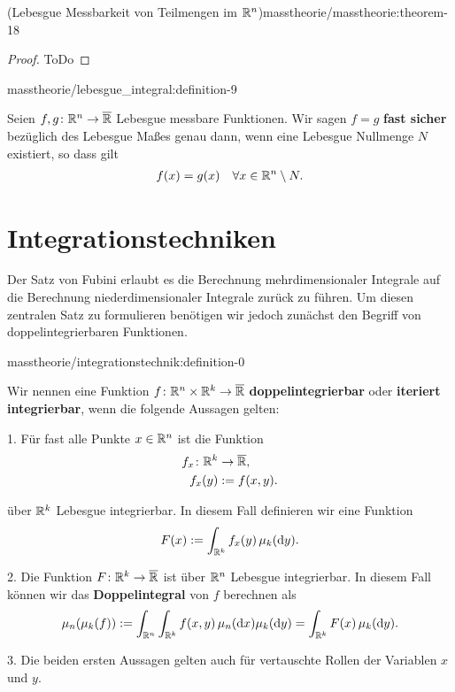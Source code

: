 \begin{theorem}{(Lebesgue Messbarkeit von Teilmengen im \protect\(\mathbb{R}^n\protect\))}{masstheorie/masstheorie:theorem-18}
\begin{proof}
 ToDo
\end{proof}
\begin{definition}{}{masstheorie/lebesgue_integral:definition-9}



\par
Seien \(f,g \colon \mathbb{R}^n \rightarrow \overline{\mathbb{R}}\) Lebesgue messbare Funktionen.
Wir sagen \(f = g\) \textbf{fast sicher} bezüglich des Lebesgue Maßes genau dann, wenn eine Lebesgue Nullmenge \(N\) existiert, so dass gilt
\begin{align*}
f(x) = g(x) \quad \forall x \in \mathbb{R}^n \setminus N.
\end{align*}\end{definition}


\section{Integrationstechniken}
\label{\detokenize{masstheorie/integrationstechnik:integrationstechniken}}\label{\detokenize{masstheorie/integrationstechnik::doc}}
\par
Der Satz von Fubini erlaubt es die Berechnung mehrdimensionaler Integrale auf die Berechnung niederdimensionaler Integrale zurück zu führen.
Um diesen zentralen Satz zu formulieren benötigen wir jedoch zunächst den Begriff von doppelintegrierbaren Funktionen.
\begin{definition}{}{masstheorie/integrationstechnik:definition-0}



\par
Wir nennen eine Funktion \(f \colon \mathbb{R}^n \times \mathbb{R}^k \rightarrow \overline{\mathbb{R}}\) \textbf{doppelintegrierbar} oder \textbf{iteriert integrierbar},
wenn die folgende Aussagen gelten:

\par
1. Für fast alle Punkte \(x \in \mathbb{R}^n\) ist die Funktion
\begin{align*}
f_x \colon \mathbb{R}^k &\rightarrow \overline{\mathbb{R}},\\
f_x(y) &:= f(x,y).
\end{align*}
\par
über \(\mathbb{R}^k\) Lebesgue integrierbar.
In diesem Fall definieren wir eine Funktion
\begin{align*}
F(x) := \int_{\mathbb{R}^k} f_x(y) \, \mu_k(\mathrm{d}y).
\end{align*}
\par
2. Die Funktion \(F \colon \mathbb{R}^k \rightarrow \overline{\mathbb{R}}\) ist über \(\mathbb{R}^n\) Lebesgue integrierbar.
In diesem Fall können wir das \textbf{Doppelintegral} von \(f\) berechnen als
\begin{align*}
\mu_n(\mu_k(f)) := \int_{\mathbb{R}^n}\int_{\mathbb{R}^k} f(x,y) \, \mu_n(\mathrm{d}x) \mu_k(\mathrm{d}y) = \int_{\mathbb{R}^k} F(x) \, \mu_k(\mathrm{d}y).
\end{align*}
\par
3. Die beiden ersten Aussagen gelten auch für vertauschte Rollen der Variablen \(x\) und \(y\).
\end{definition}


\end{theorem}

